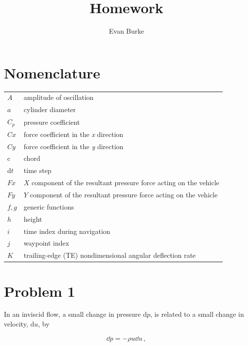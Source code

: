 \documentclass[12pt,letterpaper]{article}
\author{Evan Burke}
\title{Homework \homeworknumber}
\begin{document}
	\graphicspath{{../images}}
	
	
	\tableofcontents
	
	
	\newpage
	
	\section*{Nomenclature}
	
	{\renewcommand\arraystretch{1.0}
		\noindent\begin{longtable}{@{}l @{\quad=\quad} l@{}}
			$A$  & amplitude of oscillation \\
			$a$ &    cylinder diameter \\
			$C_p$& pressure coefficient \\
			$Cx$ & force coefficient in the \textit{x} direction \\
			$Cy$ & force coefficient in the \textit{y} direction \\
			c   & chord \\
			d$t$ & time step \\
			$Fx$ & $X$ component of the resultant pressure force acting on the vehicle \\
			$Fy$ & $Y$ component of the resultant pressure force acting on the vehicle \\
			$f, g$   & generic functions \\
			$h$  & height \\
			$i$  & time index during navigation \\
			$j$  & waypoint index \\
			$K$  & trailing-edge (TE) nondimensional angular deflection rate
	\end{longtable}}
	
	\newpage
	
	\section*{Problem 1}
	In an inviscid flow, a small change in pressure d$p$, is related to a small change in velocity, d$u$, by

	\begin{equation*}
		\dd p = - \rho u\dd u\,,
	\end{equation*}
	
\end{document}
